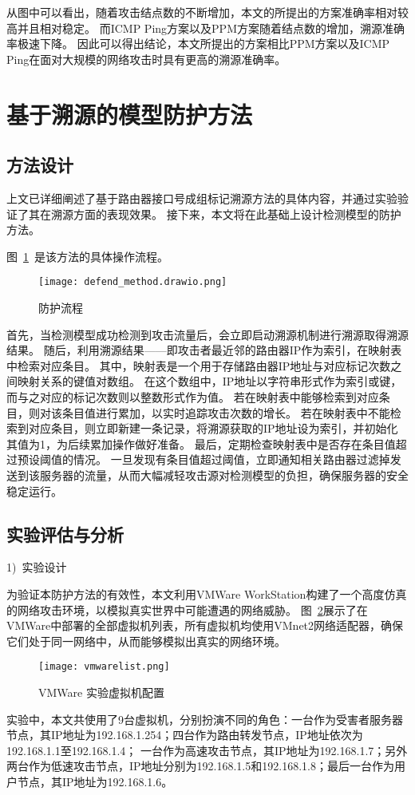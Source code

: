 \begin{enumerate}[a.]
\begin{enumerate}[a.]
\begin{enumerate}[a.]
\begin{enumerate}[a.]
\begin{enumerate}[a.]
\begin{enumerate}[a.]
\begin{enumerate}[a.]
从图中可以看出，随着攻击结点数的不断增加，本文的所提出的方案准确率相对较高并且相对稳定。
而ICMP Ping方案以及PPM方案随着结点数的增加，溯源准确率极速下降。
因此可以得出结论，本文所提出的方案相比PPM方案以及ICMP Ping在面对大规模的网络攻击时具有更高的溯源准确率。

\section{基于溯源的模型防护方法}
\subsection{方法设计}
上文已详细阐述了基于路由器接口号成组标记溯源方法的具体内容，并通过实验验证了其在溯源方面的表现效果。
接下来，本文将在此基础上设计检测模型的防护方法。\par
图~\ref{fig:defend_procedure}~是该方法的具体操作流程。
\begin{figure}[h]
	\centering
	\texttt{[image: defend\_method.drawio.png]}
	\caption{防护流程}
	\label{fig:defend_procedure}
\end{figure}
首先，当检测模型成功检测到攻击流量后，会立即启动溯源机制进行溯源取得溯源结果。
随后，利用溯源结果——即攻击者最近邻的路由器IP作为索引，在映射表中检索对应条目。
其中，映射表是一个用于存储路由器IP地址与对应标记次数之间映射关系的键值对数组。
在这个数组中，IP地址以字符串形式作为索引或键，而与之对应的标记次数则以整数形式作为值。
若在映射表中能够检索到对应条目，则对该条目值进行累加，以实时追踪攻击次数的增长。
若在映射表中不能检索到对应条目，则立即新建一条记录，将溯源获取的IP地址设为索引，并初始化其值为1，为后续累加操作做好准备。
最后，定期检查映射表中是否存在条目值超过预设阈值的情况。
一旦发现有条目值超过阈值，立即通知相关路由器过滤掉发送到该服务器的流量，从而大幅减轻攻击源对检测模型的负担，确保服务器的安全稳定运行。


\subsection{实验评估与分析}
1)~实验设计\par
为验证本防护方法的有效性，本文利用VMWare WorkStation构建了一个高度仿真的网络攻击环境，以模拟真实世界中可能遭遇的网络威胁。
图~\ref{fig:vmwarelist}展示了在VMWare中部署的全部虚拟机列表，所有虚拟机均使用VMnet2网络适配器，确保它们处于同一网络中，从而能够模拟出真实的网络环境。
\begin{figure}[h]
	\centering
	\texttt{[image: vmwarelist.png]}
	\caption{VMWare 实验虚拟机配置}
	\label{fig:vmwarelist}
\end{figure}
实验中，本文共使用了9台虚拟机，分别扮演不同的角色：一台作为受害者服务器节点，其IP地址为192.168.1.254；四台作为路由转发节点，IP地址依次为192.168.1.1至192.168.1.4；
一台作为高速攻击节点，其IP地址为192.168.1.7；另外两台作为低速攻击节点，IP地址分别为192.168.1.5和192.168.1.8；最后一台作为用户节点，其IP地址为192.168.1.6。\par


\end{enumerate}
\end{enumerate}
\end{enumerate}
\end{enumerate}
\end{enumerate}
\end{enumerate}
\end{enumerate}
